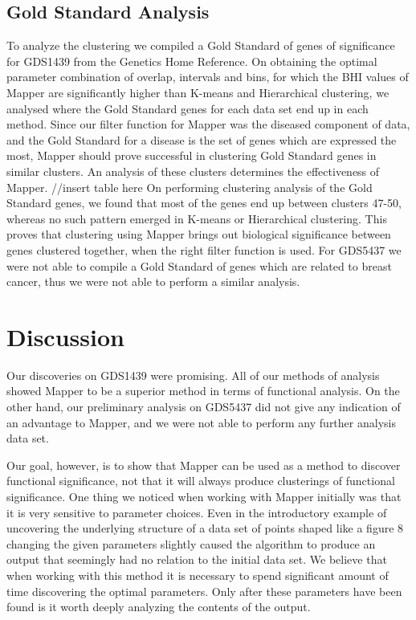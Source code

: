 \documentclass[preprint,10pt]{elsarticle}
\begin{document}
\subsection{Gold Standard Analysis}
	To analyze the clustering we compiled a Gold Standard of genes of significance for GDS1439 from the Genetics Home Reference. On obtaining the optimal parameter combination of overlap, intervals and bins, for which the BHI values of Mapper are significantly higher than K-means and Hierarchical clustering, we analysed where the Gold Standard genes for each data set end up in each method. Since our filter function for Mapper was the diseased component of data, and the Gold Standard for a disease is the set of genes which are expressed the most, Mapper should prove successful in clustering Gold Standard genes in similar clusters. An analysis of these clusters determines the effectiveness of Mapper.
//insert table here
On performing clustering analysis of the Gold Standard genes, we found that most of the genes end up between clusters 47-50, whereas no such pattern emerged in K-means or Hierarchical clustering. This proves that clustering using Mapper brings out biological significance between genes clustered together, when the right filter function is used.
	For GDS5437 we were not able to compile a Gold Standard of genes which are related to breast cancer, thus we were not able to perform a similar analysis.



\section{Discussion}
Our discoveries on GDS1439 were promising. All of our methods of analysis showed Mapper to be a superior method in terms of functional analysis. On the other hand, our preliminary analysis on GDS5437 did not give any indication of an advantage to Mapper, and we were not able to perform any further analysis data set. 

Our goal, however, is to show that Mapper can be used as a method to discover functional significance, not that it will always produce clusterings of functional significance. One thing we noticed when working with Mapper initially was that it is very sensitive to parameter choices. Even in the introductory example of uncovering the underlying structure of a data set of points shaped like a figure 8 changing the given parameters slightly caused the algorithm to produce an output that seemingly had no relation to the initial data set. We believe that when working with this method it is necessary to spend significant amount of time discovering the optimal parameters. Only after these parameters have been found is it worth deeply analyzing the contents of the output. 
\end{document}
